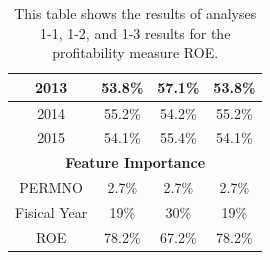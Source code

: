 {{\begin{table}[htb]
\begin{tabular}{cccc}
\multicolumn{1}{|c|}{2013}                           & \multicolumn{1}{c|}{53.8\%}              & \multicolumn{1}{c|}{57.1\%}                      & \multicolumn{1}{c|}{53.8\%}                        \\ \hline
\multicolumn{1}{|c|}{2014}                           & \multicolumn{1}{c|}{55.2\%}              & \multicolumn{1}{c|}{54.2\%}                      & \multicolumn{1}{c|}{55.2\%}                        \\ \hline
\multicolumn{1}{|c|}{2015}                           & \multicolumn{1}{c|}{54.1\%}              & \multicolumn{1}{c|}{55.4\%}                      & \multicolumn{1}{c|}{54.1\%}                        \\ \hline
\multicolumn{4}{|c|}{\textbf{Feature Importance}}                                                                                                                                                       \\ \hline
\multicolumn{1}{|c|}{PERMNO}                         & \multicolumn{1}{c|}{2.7\%}            & \multicolumn{1}{c|}{2.7\%}                    & \multicolumn{1}{c|}{2.7\%}                      \\ \hline
\multicolumn{1}{|c|}{Fisical Year}                   & \multicolumn{1}{c|}{19\%}            & \multicolumn{1}{c|}{30\%}                    & \multicolumn{1}{c|}{19\%}                      \\ \hline
\multicolumn{1}{|c|}{ROE}                            & \multicolumn{1}{c|}{78.2\%}            & \multicolumn{1}{c|}{67.2\%}                    & \multicolumn{1}{c|}{78.2\%}                      \\ \hline
\end{tabular}
\caption{This table shows the results of analyses 1-1, 1-2, and 1-3 results for the profitability measure ROE.}
\label{tab:ROE-1}
\end{table}


}}
